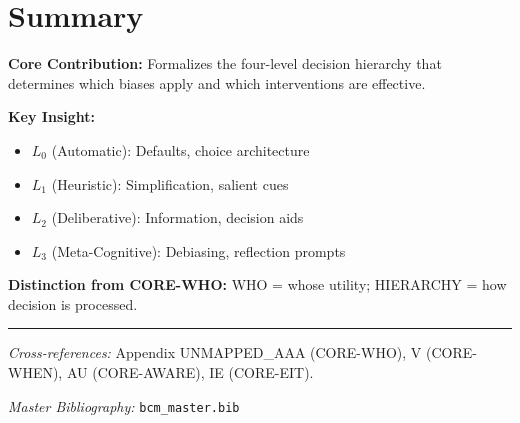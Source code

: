 \section{Summary}

\begin{tcolorbox}[colback=gray!5!white, colframe=gray!75!black,
    title=Appendix UNMAPPED_HI Summary: CORE-HIERARCHY]

\textbf{Core Contribution:}
Formalizes the four-level decision hierarchy that determines which biases
apply and which interventions are effective.

\textbf{Key Insight:}
\begin{itemize}[nosep]
\item $L_0$ (Automatic): Defaults, choice architecture
\item $L_1$ (Heuristic): Simplification, salient cues
\item $L_2$ (Deliberative): Information, decision aids
\item $L_3$ (Meta-Cognitive): Debiasing, reflection prompts
\end{itemize}

\textbf{Distinction from CORE-WHO:}
WHO = whose utility; HIERARCHY = how decision is processed.

\end{tcolorbox}

\vspace{1em}
\hrule
\vspace{0.5em}

\noindent\textit{Cross-references:}
Appendix UNMAPPED_AAA (CORE-WHO), V (CORE-WHEN), AU (CORE-AWARE), IE (CORE-EIT).

\noindent\textit{Master Bibliography:} \texttt{bcm\_master.bib}

\nocite{bcm_master}

